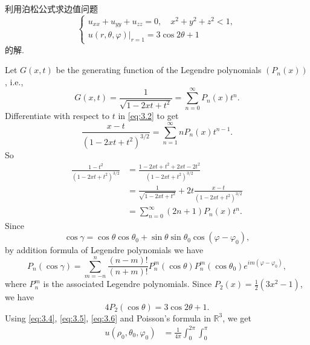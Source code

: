 \begin{exercise}
  利用泊松公式求边值问题
  \[\begin{cases}
    u_{xx} + u_{yy} + u_{zz} = 0, \quad x^2 + y^2 + z^2 < 1, \\
    u(r,\theta,\varphi)|_{r=1} = 3\cos2\theta +1
  \end{cases}\]
  的解.
\end{exercise}

\begin{solution}
  Let $G(x,t)$ be the generating function of the Legendre polynomials $(P_n(x))$, i.e.,
  \begin{equation}\label{eq:3.2}
    G(x,t) = \frac{1}{\sqrt{1-2xt+t^2}} = \sum_{n=0}^\infty P_n(x) t^n.
  \end{equation}
  Differentiate with respect to $t$ in \eqref{eq:3.2} to get
  \begin{equation}\label{eq:3.3}
    \frac{x-t}{(1-2xt+t^2)^{3/2}} = \sum_{n=1}^\infty n P_n(x) t^{n-1}.
  \end{equation}
  So
  \begin{equation}\label{eq:3.4}
    \begin{aligned}
      \frac{1-t^2}{(1-2xt+t^2)^{3/2}}
      & = \frac{1-2xt+t^2+2xt-2t^2}{(1-2xt+t^2)^{3/2}} \\
      & = \frac{1}{\sqrt{1-2xt+t^2}} + 2t \frac{x-t}{(1-2xt+t^2)^{3/2}} \\
      & = \sum_{n=0}^\infty (2n+1) P_n(x) t^n.
    \end{aligned}
  \end{equation}
  Since
  \[ \cos\gamma = \cos\theta\cos\theta_0 + \sin\theta\sin\theta_0\cos(\varphi-\varphi_0),\]
  by addition formula of Legendre polynomials we have
  \begin{equation}\label{eq:3.5}
    P_n(\cos\gamma) = \sum_{m=-n}^n \frac{(n-m)!}{(n+m)!} P_n^m(\cos\theta)
      P_n^m(\cos\theta_0) e^{im(\varphi-\varphi_0)},
  \end{equation}
  where $P_n^m$ is the associated Legendre polynomials. Since $P_2(x)=\frac12(3x^2-1)$, we have
  \begin{equation}\label{eq:3.6}
    4P_2(\cos\theta) = 3\cos2\theta+1.
  \end{equation}
  Using \eqref{eq:3.4}, \eqref{eq:3.5}, \eqref{eq:3.6} and Poisson's formula in $\mathbb{R}^3$,
  we get
  \begin{equation}\label{eq:3.7}
    \begin{aligned}
      u(\rho_0,\theta_0,\varphi_0)
      & = \frac{1}{4\pi} \int_0^{2\pi} \int_0^\pi

\end{aligned}
\end{equation}
\end{solution}
